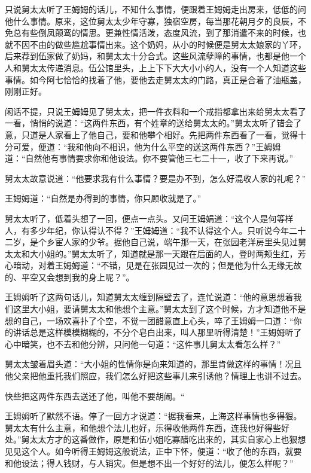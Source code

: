 \documentclass[12pt,UTF8]{ctexbook}
\begin{document}
{{{只说舅太太听了王姆姆的话儿，不知什么事情，便跟着王姆姆走出房来，低低的问他什么事情。原来，这位舅太太少年守寡，独宿空房，每当那花朝月夕的良辰，不免总有些倒凤颠鸾的情思。更兼性情活泼，态度风流，到了那消遣不来的时候，也就不因不由的做些尴尬事情出来。这个奶妈，从小的时候便是舅太太娘家的丫环，后来荐到伍家做了奶妈，和舅太太十分合式。这些风流孽障的事情，也都是他一个人和舅太太传递消息。伍公馆里头，上上下下大大小小的人，没有一个人知道这些事情。如今阿七恰恰的找着了他，要他去走舅太太的门路，真正是合着了油瓶盖，刚刚正好。

闲话不提，只说王姆姆见了舅太太，把一件衣料和一个戒指都拿出来给舅太太看了一看，悄悄的说道：“这两件东西，有个姓章的送给舅太太的。”舅太太听了错会了意，只道是人家看上了他自己，要和他攀个相好。先把两件东西看了一看，觉得十分可爱，便道：“我和他向不相识，他为什么平空的送这两件东西？”王姆姆道：“自然他有事情要求你和他设法。你不要管他三七二十一，收了下来再说。”

舅太太故意说道：“他要求我有什么事情？要是办不到，怎么好混收人家的礼呢？”

王姆姆道：“自然是办得到的事情，你只顾收就是了。”

舅太太听了，低着头想了一回，便点一点头。又问王姆娟道：“这个人是何等样人，有多少年纪，你认得认不得？”王姆姆道：“我不认得这个人。只听说今年二十二岁，是个乡宦人家的少爷。据他自己说，端午那一天，在张园老洋房里头见过舅太太和大小姐的。”舅太太听了，知道就是那一天跟在后面的人，登时两颊生红，芳心暗动，对着王姆姆道：“不错，见是在张园见过一次的；但是他为什么无缘无故的、平空又会想到我的身上呢？”。

王姆姆听了这两句话儿，知道舅太太缠到隔壁去了，连忙说道：“他的意思想着我们这里大小姐，要请舅太太和他想个主意。”舅太太到了这个时候，方才知道他不是想的自己，一场欢喜扑了个空，不觉一团醋意直上心头，啐了王姆姆一口道：“你的讲话总是这样模模糊糊的，不分个皂白出来，叫人那里听得清楚！”王姆姆听了心中暗笑，也不去和他分辨，只问他一句道：“这件事儿舅太太看怎么样？”

舅太太皱着眉头道：“大小姐的性情你是向来知道的，那里肯做这样的事情！况且他父亲把他重托我们照应，我们怎么好把这些事儿来引诱他？情理上也讲不过去。

快些把这两件东西去送还了他，叫他不要胡闹。“

王姆姆听了默然不语。停了一回方才说道：“据我看来，上海这样事情也多得狠。舅太太有什么主意，和他想个法儿也好，乐得收他两件东西，连我也好得些好处。”舅太太方才的这番做作，原是和伍小姐吃寡醋吃出来的，其实自家心上也狠想见见这个人。如今听得王姆姆这般说法，正中下怀，便道：“收了他的东西，就要和他设法；得人钱财，与人销灾。但是想不出一个好好的法儿，便怎么样呢？”

}}}
\end{document}
